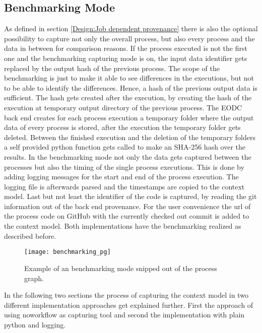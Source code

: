 \documentclass[draft,final]{vutinfth} %
\begin{document}
\subsection{Benchmarking Mode}\label{Implementation:Benchmarking Mode}
As defined in section \ref{Design:Job dependent provenance} there is also the optional possibility to capture not only the overall process, but also every process and the data in between for comparison reasons. 
If the process executed is not the first one and the benchmarking capturing mode is on, the input data identifier gets replaced by the output hash of the previous process. The scope of the benchmarking is just to make it able to see differences in the executions, but not to be able to identify the differences. Hence, a hash of the previous output data is sufficient. The hash gets created after the execution, by creating the hash of the execution at temporary output directory of the previous process. The EODC back end creates for each process execution a temporary folder where the output data of every process is stored, after the execution the temporary folder gets deleted. Between the finished execution and the deletion of the temporary folders a self provided python function gets called to make an SHA-256 hash over the results. In the benchmarking mode not only the data gets captured between the processes but also the timing of the single process executions. This is done by adding logging messages for the start and end of the process execution. The logging file is afterwards parsed and the timestamps are copied to the context model. Last but not least the identifier of the code is captured, by reading the git information out of the back end provenance. For the user convenience the url of the process code on GitHub with the currently checked out commit is added to the context model. Both implementations have the benchmarking realized as described before.    

\begin{figure}[h]
	\centering
	\texttt{[image: benchmarking\_pg]}
	\caption{Example of an benchmarking mode snipped out of the process graph.}
	\label{fig:benchmarking_pg} %
\end{figure}

In the following two sections the process of capturing the context model in two different implementation approaches get explained further. First the approach of using noworkflow as capturing tool and second the implementation with plain python and logging. 
\end{document}
